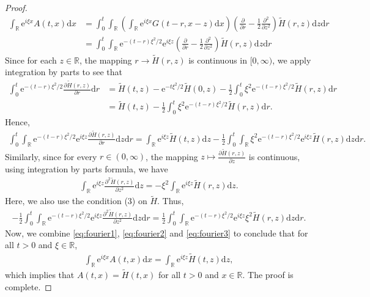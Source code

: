 \documentclass[12pt,a4paper]{article}
\newcommand{\R}{{\mathbb{R}}}
\renewcommand{\d}{\mathrm{d}}
\newcommand{\<}{\langle}
\renewcommand{\>}{\rangle}
\newcommand{\e}{\mathrm{e}}
\begin{document}
\begin{proof}
\begin{align}\label{eq:fourier1}
\int_\R \e^{i\xi x}A(t,x)\d x &= \int_0^t\int_\R \left(\int_\R \e^{i\xi x}G(t-r, x-z)\d x\right)\left(\frac{\partial }{\partial r}-\frac12\frac{\partial^2}{\partial z^2}\right)\tilde{H}(r,z)\d z\d r \nonumber\\
&= \int_0^t\int_\R \e^{-(t-r)\xi^2/2}\e^{i\xi z} \left(\frac{\partial }{\partial r}-\frac12\frac{\partial^2}{\partial z^2}\right)\tilde{H}(r,z)\d z\d r
\end{align}
Since for each $z\in \R$, the mapping $r\to \tilde{H}(r,z)$ is continuous in $[0, \infty)$,  we apply integration by parts to see that
\begin{align*}
\int_0^t \e^{-(t-r)\xi^2/2}\frac{\partial \tilde{H}(r,z)}{\partial r}\d r& = \tilde{H}(t, z)- \e^{-t\xi^2/2}\tilde{H}(0, z)- \frac12\int_0^t \xi^2\e^{-(t-r)\xi^2/2}\tilde{H}(r,z)\d r\\
&= \tilde{H}(t, z)-\frac12 \int_0^t \xi^2\e^{-(t-r)\xi^2/2}\tilde{H}(r,z)\d r.
\end{align*}
Hence, 
\begin{align}\label{eq:fourier2}
\int_0^t \int_\R \e^{-(t-r)\xi^2/2}\e^{i\xi z}  \frac{\partial \tilde{H}(r,z)}{\partial r}\d z\d r
=\int_\R \e^{i\xi z}\tilde{H}(t,z)\d z -\frac12 \int_0^t \int_\R\xi^2\e^{-(t-r)\xi^2/2}\e^{i\xi z}\tilde{H}(r,z) \d z \d r.
\end{align}
Similarly, since for every $r\in (0, \infty)$, the mapping $z\mapsto \frac{\partial \tilde{H}(r,z)}{\partial z}$ is continuous, using integration by parts formula, we have
\begin{align*}
\int_\R\e^{i\xi z} \frac{\partial^2\tilde{H}(r,z)}{\partial z^2} \d z= - \xi^2 \int_\R \e^{i\xi z}\tilde{H}(r,z) \d z.
\end{align*}
Here, we also use the condition (3) on $\tilde{H}$.  Thus, 
\begin{align}\label{eq:fourier3}
-\frac12 \int_0^t\int_\R \e^{-(t-r)\xi^2/2}\e^{i\xi z} \frac{\partial^2 \tilde{H}(r,z)}{\partial z^2}\d z\d r= \frac12
\int_0^t\int_\R \e^{-(t-r)\xi^2/2}\e^{i\xi z}\xi^2 \tilde{H}(r,z)\d z\d r. 
\end{align}
Now, we combine \eqref{eq:fourier1}, \eqref{eq:fourier2} and \eqref{eq:fourier3} to conclude that for all $t>0$ and $\xi \in\R$,
\begin{align*}
\int_\R \e^{i\xi x}A(t,x)\d x= \int_\R \e^{i\xi z}\tilde{H}(t,z)\d z,
\end{align*}
which implies that $A(t,x)=\tilde{H}(t,x)$ for all $t>0$ and $x\in \R$. The proof is complete. 
\fi %
\end{proof}
\end{document}
